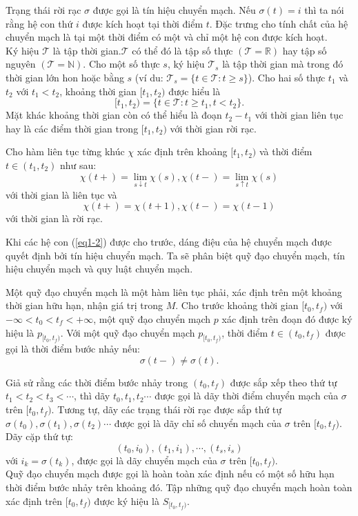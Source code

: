 \documentclass[14pt,a4paper,oneside]{report}		%
\begin{document}
Trạng thái rời rạc $\sigma$ được gọi là tín hiệu chuyển mạch. Nếu $\sigma(t)=i$ thì ta nói rằng hệ con thứ $i$ được kích hoạt tại thời điểm $t$. Đặc trưng cho tính chất của hệ chuyển mạch là tại một thời điểm có một và chỉ một hệ con được kích hoạt.\\

Ký hiệu $\mathcal{T}$ là tập thời gian.$\mathcal{T}$ có thể đó là tập số thực $(\mathcal{T} = \mathbb{R})$ hay tập số nguyên $(\mathcal{T} = \mathbb{N})$. Cho một số thực $s$, ký hiệu $\mathcal{T}_s$ là tập thời gian mà trong đó thời gian lớn hon hoặc bằng $s$ (ví du: $\mathcal{T}_s=\{t\in\mathcal{T} : t\geq s\}$). Cho hai số thực $t_1$ và $t_2$ với $t_1 < t_2$, khoảng thời gian $[t_1, t_2)$ được hiểu là
$$[t_1, t_2)=\{t\in\mathcal{T}: t\geq t_1, t<t_2\}.$$
Mặt khác khoảng thời gian còn có thể hiểu là đoạn $t_2 - t_1$ với thời gian liên tục hay là các điểm thời gian trong $[t_1,t_2)$ với thời gian rời rạc. 

Cho hàm liên tục từng khúc $\chi$ xác định trên khoảng $[t_1,t_2)$ và thời điểm $t \in (t_1,t_2)$ như sau:
$$\chi(t+)=\lim_{s\downarrow t}\chi(s), \chi(t-)=\lim_{s\uparrow t}\chi(s)$$
với thời gian là liên tục và
$$\chi(t+)=\chi(t+1), \chi(t-)=\chi(t-1)$$
với thời gian là rời rạc.

Khi các hệ con (\ref{eq1-2}) được cho trước, dáng điệu của hệ chuyển mạch được quyết định bởi tín hiệu chuyển mạch. Ta sẽ phân biệt quỹ đạo chuyển mạch, tín hiệu chuyển mạch và quy luật chuyển mạch.

Một quỹ đạo chuyển mạch là một hàm liên tục phải, xác định trên một khoảng thời gian hữu hạn, nhận giá trị trong $M$.
Cho trước khoảng thời gian $[t_0,t_f)$ với $-\infty < t_0 < t_f < +\infty$, một quỹ đạo chuyển mạch $p$ xác định trên đoạn đó được ký hiệu là $p_{[t_0,t_f)}$. Với một quỹ đạo chuyển mạch $p_{[t_0,t_f)}$, thời điểm $t\in (t_0,t_f)$ được gọi là thời điểm bước nhảy nếu:
$$\sigma(t-)\neq\sigma(t).$$

Giả sử rằng các thời điểm bước nhảy trong $(t_0, t_f)$ được sắp xếp theo thứ tự $t_1 < t_2 < t_3 < \cdots$, thì dãy $t_0,t_1,t_2\cdots$ được gọi là dãy thời điểm chuyển mạch của $\sigma$ trên $[t_0,t_f)$. Tương tự, dãy các trạng thái rời rạc được sắp thứ tự $\sigma(t_0),\sigma(t_1),\sigma(t_2)\cdots$ được gọi là dãy chỉ số chuyển mạch của $\sigma$ trên $[t_0,t_f)$. Dãy cặp thứ tự:
$$(t_0,i_0),(t_1,i_1),\cdots,(t_s,i_s)$$
với $i_k=\sigma(t_k)$, được gọi là dãy chuyển mạch của $\sigma$ trên $[t_0,t_f)$.\\
Quỹ đạo chuyển mạch được gọi là hoàn toàn xác định nếu có một số hữu hạn thời điểm bước nhảy trên khoảng đó. Tập những quỹ đạo chuyển mạch hoàn toàn xác định trên $[t_0,t_f)$ được ký hiệu là $S_{[t_0,t_f)}$.
\end{document}
